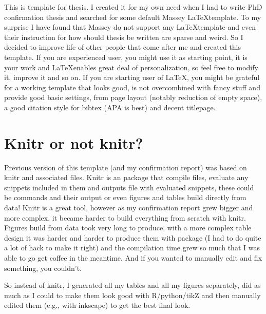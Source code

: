 
This is template for thesis. I created it for my own need when I had to write PhD confirmation thesis and searched for some default Massey \LaTeX template. To my surprise I have found that Massey do not support any \LaTeX template and even their instruction for how should thesis be written are sparse and weird. So I decided to improve life of other people that come after me and created this template. If you are experienced user, you might use it as starting point, it is your work and \LaTeX enables great deal of personalization, so feel free to modify it, improve it and so on. If you are starting user of \LaTeX, you might be grateful for a working template that looks good, is not overcombined with fancy stuff and provide good basic settings, from page layout (notably reduction of empty space), a good citation style for bibtex (APA is best) and decent titlepage.

\section{Knitr or not knitr?}
Previous version of this template (and my confirmation report) was based on knitr and associated  files. Knitr is an  package that compile  files, evaluate any  snippets included in them and outputs  file with evaluated snippets, these could be  commands and their output or even figures and tables build directly from data! Knitr is a great tool, however as my confirmation report grew bigger and more complex, it became harder to build everything from scratch with knitr. Figures build from data took very long to produce, with a more complex table design it was harder and harder to produce them with  package (I had to do quite a lot of hack to make it right) and the compilation time grew so much that I was able to go get coffee in the meantime. And if you wanted to manually edit and fix something, you couldn't.

So instead of knitr, I generated all my tables and all my figures separately, did as much as I could to make them look good with R/python/tikZ and then manually edited them (e.g., with inkscape) to get the best final look.
